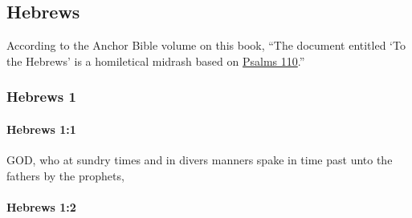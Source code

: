 \subsection{Hebrews}
	\label{HEBREWS}
	
	According to the Anchor Bible volume on this book, ``The document entitled `To the Hebrews' is a homiletical midrash based on \hyperref[PSALMS-110]{Psalms 110}.''
	
	\subsubsection{Hebrews 1} %
		\label{HEBREWS-1}
		
		\paragraph{Hebrews 1:1} %
			\label{HEBREWS-1-1}

			GOD, who at sundry times and in divers manners spake in time past unto the fathers by the prophets,

			\begin{framed}
			\scriptsize
				\begin{compactdesc}
					\item[SBLG] 
				\end{compactdesc}
			\end{framed}

		\paragraph{Hebrews 1:2} %
			\label{HEBREWS-1-2}

